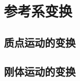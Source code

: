 

\section{参考系变换}\label{2-3}

\subsection{质点运动的变换}\label{2-3-1}

\subsection{刚体运动的变换}\label{2-3-2}

